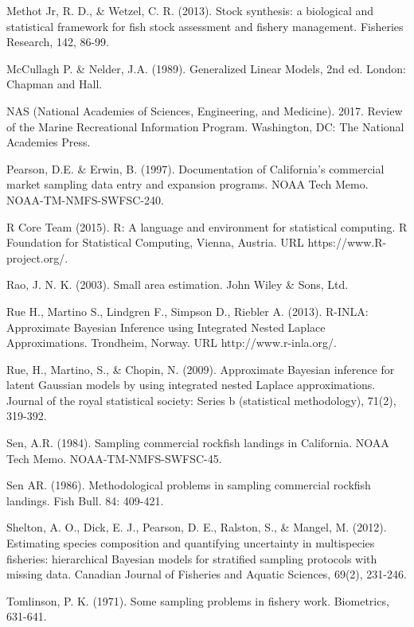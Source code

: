 \documentclass[12pt]{article}
\begin{document}
\begin{thebibliography}{1}
%
 Methot Jr, R. D., \& Wetzel, C. R. (2013). Stock synthesis: a 
biological and statistical framework for fish stock assessment and fishery 
management.  Fisheries Research, 142, 86-99.

%
 McCullagh P. \& Nelder, J.A. (1989). Generalized Linear 
Models, 2nd ed. London: Chapman and Hall.

%
 NAS (National Academies of Sciences, Engineering, and Medicine). 
2017. Review of the Marine Recreational Information Program. Washington, DC: 
The National Academies Press.

%
 Pearson, D.E. \& Erwin, B. (1997). Documentation of 
California’s commercial market sampling data entry and expansion programs. 
NOAA Tech Memo. NOAA-TM-NMFS-SWFSC-240.

%
 R Core Team (2015). R: A language and environment for 
statistical computing. R Foundation for Statistical Computing, Vienna, 
Austria. URL https://www.R-project.org/.

%
 Rao, J. N. K. (2003). Small area estimation. John Wiley \& Sons, Ltd.

%
 Rue H., Martino S., Lindgren F., Simpson D., Riebler A. 
(2013). R-INLA: Approximate Bayesian Inference using Integrated Nested Laplace 
Approximations.  Trondheim, Norway. URL 
http://www.r-inla.org/.

%
 Rue, H., Martino, S., \& Chopin, N. (2009). Approximate 
Bayesian inference for latent Gaussian models by using integrated nested 
Laplace approximations. Journal of the royal statistical society: 
Series b (statistical methodology), 71(2), 319-392.

%
 Sen, A.R. (1984). Sampling commercial rockfish landings in 
California. NOAA Tech Memo. NOAA-TM-NMFS-SWFSC-45.

%
 Sen AR. (1986). Methodological problems in sampling 
commercial rockfish landings. Fish Bull. 84: 409-421.

%
 Shelton, A. O., Dick, E. J., Pearson, D. E., Ralston, 
S., \& Mangel, M. (2012). Estimating species composition and quantifying 
uncertainty in multispecies fisheries: hierarchical Bayesian models for 
stratified sampling protocols with missing data. Canadian Journal of Fisheries 
and Aquatic Sciences, 69(2), 231-246.

%
 Tomlinson, P. K. (1971). Some sampling problems in 
fishery work. Biometrics, 631-641.

\end{thebibliography}

%
\end{document}
